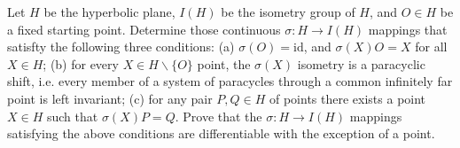 Let $H$ be the hyperbolic plane, $I(H)$ be the isometry group of $H$, and $O\in H$ be a fixed starting point. Determine those continuous $\sigma\colon H\rightarrow I(H)$ mappings that satisfty the following three conditions:
(a) $\sigma(O)=\mathrm{id}$, and $\sigma (X)O=X$ for all $X\in H$;
(b) for every $X\in H\backslash \{ O\}$ point, the $\sigma(X)$ isometry is a paracyclic shift, i.e. every member of a system of paracycles through a common infinitely far point is left invariant;
(c) for any pair $P,Q\in H$ of points there exists a point $X\in H$ such that $\sigma(X)P=Q$.
Prove that the $\sigma\colon H\rightarrow I(H)$ mappings satisfying the above conditions are differentiable with the exception of a point.